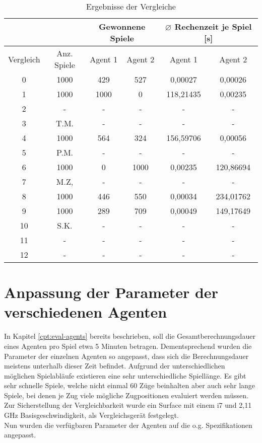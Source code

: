 \begin{table}[ht]
\begin{center}
\begin{tabular}{| c | c | c | c | c | c |} \hline
\multicolumn{2}{|c|}{}  & \multicolumn{2}{|c|}{Gewonnene Spiele} & \multicolumn{2}{|c|}{$\varnothing$ Rechenzeit je Spiel [s]} \\ \hline
Vergleich & Anz. Spiele & Agent 1 & Agent 2 & Agent 1 & Agent 2 \\ \hline
\hline
 0 & 1000 & 429  &  527 &   0,00027 &   0,00026 \\ \hline
 \hline
 1 & 1000 & 1000 &    0 & 118,21435 &   0,00235 \\ \hline
 2 & -    & -    & -    & -         & -         \\ \hline
 3 & T.M. & -    & -    & -         & -         \\ \hline
 4 & 1000 &  564 &  324 & 156,59706 &   0,00056 \\ \hline
 5 & P.M. & -    & -    & -         & -         \\ \hline
 \hline
 6 & 1000 &    0 & 1000 &   0,00235 & 120,86694 \\ \hline
 7 & M.Z, & -    & -    & -         & -         \\ \hline
 8 & 1000 &  446 &  550 &   0,00034 & 234,01762 \\ \hline
 9 & 1000 &  289 &  709 &   0,00049 & 149,17649 \\ \hline
10 & S.K. & -    & -    & -         & -         \\ \hline
\hline
11 & -    & -    & -    & -         & -         \\ \hline
12 & -    & -    & -    & -         & -         \\ \hline
\end{tabular}
\end{center}
\caption{Ergebnisse der Vergleiche}
\label{tbl:cmp-results}
\end{table}

\section{Anpassung der Parameter der verschiedenen Agenten}
In Kapitel \ref{cpt:eval-agents} bereits beschrieben, soll die Gesamtberechnungsdauer eines Agenten pro Spiel etwa 5 Minuten betragen. Dementsprechend wurden die Parameter der einzelnen Agenten so angepasst, dass sich die Berechnungsdauer meistens unterhalb dieser Zeit befindet. Aufgrund der unterschiedlichen möglichen Spielabläufe existieren eine sehr unterschiedliche Spiellänge. Es gibt sehr schnelle Spiele, welche nicht einmal 60 Züge beinhalten aber auch sehr lange Spiele, bei denen je Zug viele mögliche Zugpositionen evaluiert werden müssen. Zur Sicherstellung der Vergleichbarkeit wurde ein Surface mit einem i7 und 2,11 GHz Basisgeschwindigkeit, als Vergleichsgerät festgelegt. 
\\Nun wurden die verfügbaren Parameter der Agenten auf die o.g. Spezifikationen angepasst.
